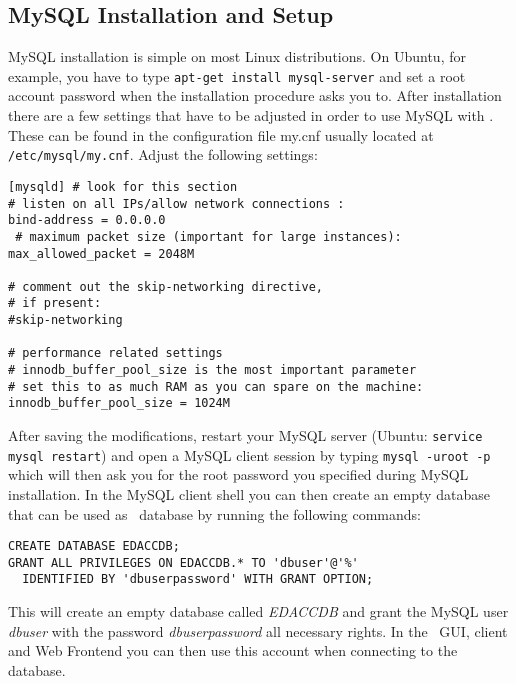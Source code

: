 \subsection{MySQL Installation and Setup}
MySQL installation is simple on most Linux distributions. On Ubuntu, for example, you
have to type \texttt{apt-get install mysql-server} and set a root account password
when the installation procedure asks you to.
 After installation there are a few settings
that have to be adjusted in order to use MySQL with \edacc. These can be found in the configuration file
my.cnf usually located at \texttt{/etc/mysql/my.cnf}. Adjust the following settings:
\begin{verbatim}
[mysqld] # look for this section
# listen on all IPs/allow network connections :
bind-address = 0.0.0.0
 # maximum packet size (important for large instances):
max_allowed_packet = 2048M

# comment out the skip-networking directive,
# if present:
#skip-networking

# performance related settings
# innodb_buffer_pool_size is the most important parameter
# set this to as much RAM as you can spare on the machine:
innodb_buffer_pool_size = 1024M
\end{verbatim}
After saving the modifications, restart your MySQL server (Ubuntu: \texttt{service mysql restart})
and open a MySQL client session by typing \texttt{mysql -uroot -p} which will then ask you for
the root password you specified during MySQL installation.
In the MySQL client shell you can then create an empty database that can be used as \edacc~database
by running the following commands:
\begin{verbatim}
CREATE DATABASE EDACCDB;
GRANT ALL PRIVILEGES ON EDACCDB.* TO 'dbuser'@'%'
  IDENTIFIED BY 'dbuserpassword' WITH GRANT OPTION;
\end{verbatim}
This will create an empty database called \textit{EDACCDB} and grant the MySQL user \textit{dbuser}
with the password \textit{dbuserpassword} all necessary rights. In the \edacc~GUI, client and Web Frontend
you can then use this account when connecting to the database.
